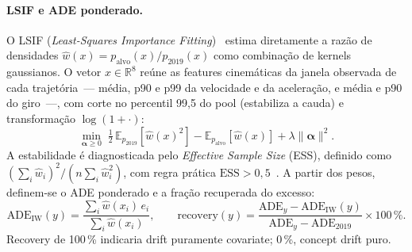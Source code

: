 \documentclass[runningheads]{llncs}
\begin{document}
\paragraph{LSIF e ADE ponderado.}
O LSIF (\emph{Least-Squares Importance Fitting})~\cite{kliep,kanamori2009,sugiyama_book} estima diretamente a raz\~ao de densidades $\hat{w}(x) = p_{\text{alvo}}(x)/p_{2019}(x)$ como combina\c{c}\~ao de kernels gaussianos. O vetor $x \in \mathbb{R}^{8}$ re\'une as features cinem\'aticas da janela observada de cada trajet\'oria~--- m\'edia, p90 e p99 da velocidade e da acelera\c{c}\~ao, e m\'edia e p90 do giro~---, com corte no percentil 99{,}5 do pool (estabiliza a cauda) e transforma\c{c}\~ao $\log(1+\cdot)$:
\begin{equation}\label{eq:lsif}
\min_{\boldsymbol\alpha \geq 0}\;
\tfrac{1}{2}\,\mathbb{E}_{p_{2019}}[\hat{w}(x)^2] -
\mathbb{E}_{p_{\text{alvo}}}[\hat{w}(x)] + \lambda\|\boldsymbol\alpha\|^2.
\end{equation}
A estabilidade \'e diagnosticada pelo \emph{Effective Sample Size} (ESS),
definido como $(\sum_i \hat{w}_i)^2/(n\sum_i \hat{w}_i^2)$, com regra
pr\'atica $\mathrm{ESS} > 0{,}5$~\cite{sugiyama_book}. A partir dos pesos,
definem-se o ADE ponderado e a fra\c{c}\~ao recuperada do excesso:
\begin{equation}\label{eq:recovery}
\mathrm{ADE}_{\mathrm{IW}}(y) =
    \frac{\sum_i \hat{w}(x_i)\,e_i}{\sum_i \hat{w}(x_i)}, \qquad
\mathrm{recovery}(y) =
    \frac{\mathrm{ADE}_y - \mathrm{ADE}_{\mathrm{IW}}(y)}
         {\mathrm{ADE}_y - \mathrm{ADE}_{2019}} \times 100\,\%.
\end{equation}
Recovery de 100\,\% indicaria drift puramente covariate; 0\,\%, concept drift puro.
\end{document}
